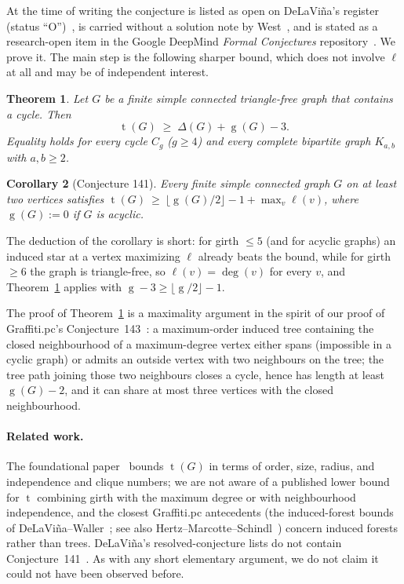 \documentclass[11pt]{article}
\numberwithin{equation}{section}
\newtheorem{theorem}{Theorem}[section]
\newtheorem{corollary}[theorem]{Corollary}
\theoremstyle{remark}
\newcommand{\tr}{\operatorname{t}}
\newcommand{\gr}{\operatorname{g}}
\newcommand{\lv}{\ell}
\begin{document}
At the time of writing the conjecture is listed as open on DeLaVi\~na's
register (status ``O'')~\cite{WOWII}, is carried without a solution note by
West~\cite{WestReg}, and is stated as a research-open item in the Google
DeepMind \emph{Formal Conjectures} repository~\cite{FC,FC141}.  We prove it.
The main step is the following sharper bound, which does not involve
$\lv$ at all and may be of independent interest.

\begin{theorem}\label{thm:main}
Let $G$ be a finite simple connected triangle-free graph that contains a
cycle.  Then
\[
  \tr(G)\;\ge\;\Delta(G)+\gr(G)-3 .
\]
Equality holds for every cycle $C_g$ ($g\ge4$) and every complete bipartite
graph $K_{a,b}$ with $a,b\ge2$.
\end{theorem}

\begin{corollary}[Conjecture 141]\label{cor:141}
Every finite simple connected graph $G$ on at least two vertices satisfies
$\tr(G)\ \ge\ \lfloor \gr(G)/2\rfloor - 1 + \max_v \lv(v)$, where
$\gr(G):=0$ if $G$ is acyclic.
\end{corollary}

The deduction of the corollary is short: for girth $\le5$ (and for acyclic
graphs) an induced star at a vertex maximizing $\lv$ already beats the bound,
while for girth $\ge6$ the graph is triangle-free, so $\lv(v)=\deg(v)$ for
every $v$, and Theorem~\ref{thm:main} applies with
$\gr-3\ge\lfloor\gr/2\rfloor-1$.

The proof of Theorem~\ref{thm:main} is a maximality argument in the spirit of
our proof of Graffiti.pc's Conjecture~143~\cite{W143}: a maximum-order induced
tree containing the closed neighbourhood of a maximum-degree vertex either
spans (impossible in a cyclic graph) or admits an outside vertex with two
neighbours on the tree; the tree path joining those two neighbours closes a
cycle, hence has length at least $\gr(G)-2$, and it can share at most three
vertices with the closed neighbourhood.

\paragraph{Related work.}
The foundational paper~\cite{ESS86} bounds $\tr(G)$ in terms of order, size,
radius, and independence and clique numbers; we are not aware of a published
lower bound for $\tr$ combining girth with the maximum degree or with
neighbourhood independence, and the closest Graffiti.pc antecedents (the
induced-forest bounds of DeLaVi\~na--Waller~\cite{DW04}; see also
Hertz--Marcotte--Schindl~\cite{HMS14}) concern induced forests rather than
trees.  DeLaVi\~na's resolved-conjecture lists do not contain
Conjecture~141~\cite{WOWII}.  As with any short elementary argument, we do
not claim it could not have been observed before.
\end{document}

